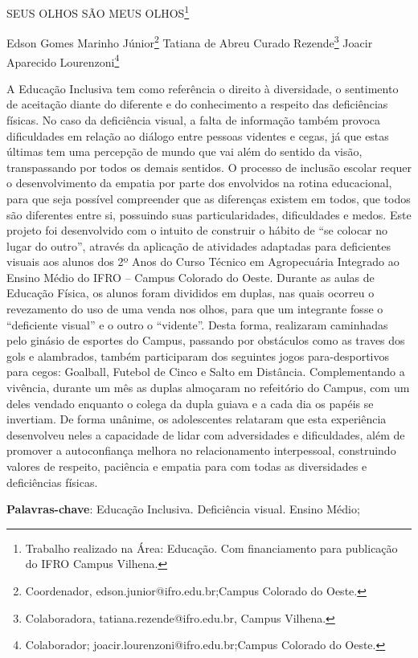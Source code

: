 \documentclass[article,12pt,onesidea,4paper,english,brazil]{abntex2}
\begin{document}
	
	
	\frenchspacing 
	
	\begin{center}
		\LARGE SEUS OLHOS SÃO MEUS OLHOS\footnote{Trabalho realizado na Área: Educação. Com financiamento para publicação do IFRO Campus Vilhena.}
		
		\normalsize
		Edson Gomes Marinho Júnior\footnote{Coordenador, edson.junior@ifro.edu.br;Campus Colorado do Oeste.} 
		Tatiana de Abreu Curado Rezende\footnote{Colaboradora, tatiana.rezende@ifro.edu.br, Campus Vilhena.}
		Joacir Aparecido Lourenzoni\footnote{Colaborador; joacir.lourenzoni@ifro.edu.br;Campus Colorado do Oeste.} 
	\end{center}
	
	\noindent A Educação Inclusiva tem como referência o direito à diversidade, o sentimento de aceitação diante do diferente e do conhecimento a respeito das deficiências físicas. No caso da deficiência visual, a falta de informação também provoca dificuldades em relação ao diálogo entre pessoas videntes e cegas, já que estas últimas tem uma percepção de mundo que vai além do sentido da visão, transpassando por todos os demais sentidos. O processo de inclusão escolar requer o desenvolvimento da empatia por parte dos envolvidos na rotina educacional, para que seja possível compreender que as diferenças existem em todos, que todos são diferentes entre si, possuindo suas particularidades, dificuldades e medos. Este projeto foi desenvolvido com o intuito de construir o hábito de “se colocar no lugar do outro”, através da aplicação de atividades adaptadas para deficientes visuais aos alunos dos 2º Anos do Curso Técnico em Agropecuária Integrado ao Ensino Médio do IFRO – Campus Colorado do Oeste. Durante as aulas de Educação Física, os alunos foram divididos em duplas, nas quais ocorreu o revezamento do uso de uma venda nos olhos, para que um integrante fosse o “deficiente visual” e o outro o “vidente”. Desta forma, realizaram caminhadas pelo ginásio de esportes do Campus, passando por obstáculos como as traves dos gols e alambrados, também participaram dos seguintes jogos para-desportivos para cegos: Goalball, Futebol de Cinco e Salto em Distância.  Complementando a vivência, durante um mês as duplas almoçaram no refeitório do Campus, com um deles vendado enquanto o colega da dupla guiava e a cada dia os papéis se invertiam. De forma unânime, os adolescentes relataram que esta experiência desenvolveu neles a capacidade de lidar com adversidades e dificuldades, além de promover a autoconfiança melhora no relacionamento interpessoal, construindo valores de respeito, paciência e empatia para com todas as diversidades e deficiências físicas.
	
	\vspace{\onelineskip}
	
	\noindent
	\textbf{Palavras-chave}: Educação Inclusiva. Deficiência visual. Ensino Médio;
	
\end{document}
